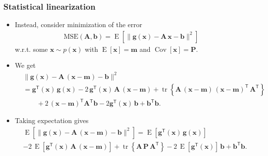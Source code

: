 \documentclass[first=dgreen,second=purple,presentation]{elecslides}
\newcommand{\mbf}[1]{\mathbf{#1}}
\newcommand{\T}[0]{\mathsf{T}}
\DeclareMathOperator{\tr}{tr}
\DeclareMathOperator{\Cov}{Cov}
\DeclareMathOperator{\E}{E}
\newcommand{\vb}{\mbf{b}}
\newcommand{\vg}{\mbf{g}}
\newcommand{\vm}{\mbf{m}}
\newcommand{\vx}{\mbf{x}}
\newcommand{\MA}{\mbf{A}}
\newcommand{\MP}{\mbf{P}}
\begin{document}
\begin{frame}
 \frametitle{Statistical linearization}

\begin{itemize}[<+->]
\item Instead, consider \alert{minimization of the error}
%
\begin{equation}
\begin{split}
  \mathrm{MSE}(\MA,\vb) = \E\left[ \| \vg(\vx) - \MA \, \vx - \vb \|^2 \right]
\end{split}
\nonumber
\end{equation}
%
w.r.t. some $\vx \sim p(\vx)$ with $\E[\vx] = \vm$ and $\Cov[\vx] = \MP$.

\item We get
%
\begin{equation}
\begin{split}
  &\| \vg(\vx) - \MA \, (\vx - \vm) - \vb\|^2 \\
  &= \vg^\T(\vx)\, \vg(\vx) 
  - 2 \, \vg^\T(\vx) \, \MA \, (\vx - \vm) + \tr \left\{ \MA \, (\vx - \vm) \, (\vx - \vm)^\T \, \MA^\T \right\} \\
  &\qquad + 2 \, (\vx - \vm)^\T \MA^\T \vb
    - 2 \vg^\T(\vx) \, \vb + \vb^\T \vb.
\end{split}
\nonumber
\end{equation}

\item Taking \alert{expectation} gives
%
\begin{equation}
\begin{split}
  &\E\left[ \| \vg(\vx) - \MA \, (\vx - \vm) - \vb\|^2 \right] 
  = \E\left[ \vg^\T(\vx) \, \vg(\vx)\right] \\
  &- 2 \, \E\left[ \vg^\T(\vx) \, \MA \, (\vx - \vm) \right] + \tr\left\{ \MA \, \MP \, \MA^\T \right\} 
  - 2 \, \E\left[ \vg^\T(\vx)\right] \, \vb + \vb^\T \vb.
\end{split}
\nonumber
\end{equation}
%
\end{itemize}
\end{frame}
\end{document}
